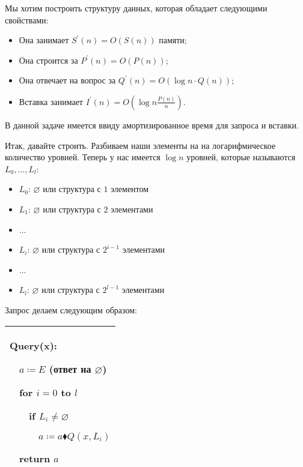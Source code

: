 \begin{task}
    Мы хотим построить структуру данных, которая обладает следующими свойствами:

    \begin{itemize}
        \item Она занимает $S^\prime(n)=O(S(n))$ памяти;

        \item Она строится за $P^\prime(n)=O(P(n))$;

        \item Она отвечает на вопрос за $Q^\prime(n)=O(\log n\cdot Q(n))$;

        \item Вставка занимает $I^\prime(n)=O\left(\log n\frac{P(n)}{n}\right)$.


    \end{itemize}

    В данной задаче имеется ввиду амортизированное время для запроса и вставки.
\end{task}

Итак, давайте строить. Разбиваем наши элементы на на логарифмическое количество уровней. Теперь у нас имеется $\log n $ уровней, которые называются $L_0,\ldots,L_l$:
\begin{itemize}
    \item $L_0$: $\varnothing$ или структура с $1$ элементом

    \item $L_1$: $\varnothing$ или структура с $2$ элементами

    \item ...

    \item $L_i$: $\varnothing$ или структура с $2^{i-1}$ элементами

    \item ...

    \item $L_l$: $\varnothing$ или структура с $2^{l-1}$ элементами
\end{itemize}

Запрос делаем следующим образом:


\begin{tabular}{|p{4cm}|}
    \hline
    Query(x):

    $\quad$$a \coloneqq E$ (ответ на $\varnothing$)

        $\quad$for $i=0$ to $l$

    $\quad$$\quad$if $L_i \ne \varnothing$

    $\quad$$\quad$$\quad$$a \coloneqq a\blacklozenge Q(x,L_i)$

    $\quad$return $a$ \\
    \hline
\end{tabular}


